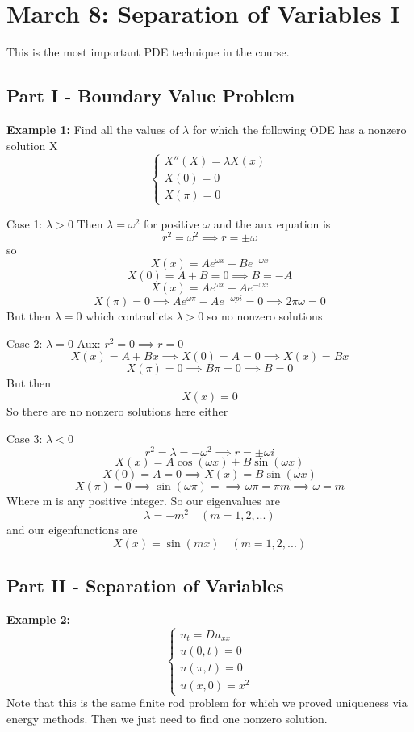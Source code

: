 \documentclass[12pt]{article}
\begin{document}
\section{March 8: Separation of Variables I}
This is the most important PDE technique in the course. 

\subsection*{Part I - Boundary Value Problem}
\textbf{Example 1:}
Find all the values of $\lambda$ for which the following ODE has a nonzero solution X 
\[\begin{cases}
    X''(X) = \lambda X(x)\\
    X(0) = 0\\
    X(\pi) = 0
\end{cases}\]

Case 1: $\lambda > 0$ 
Then $\lambda = \omega^2$ for positive $\omega$ and the aux equation is 
\[r^2 = \omega^2 \implies r = \pm \omega\]
so 
\[X(x) = Ae^{\omega x} + Be^{-\omega x}\] 
\[X(0) = A + B = 0 \implies B = -A\]
\[X(x) = Ae^{\omega x} -Ae^{-\omega x}\]
\[X(\pi) = 0 \implies Ae^{\omega \pi} -Ae^{-\omega pi} = 0 \implies 2\pi \omega = 0\]
But then $\lambda = 0$ which contradicts $\lambda >0$ so no nonzero solutions 

Case 2: $\lambda = 0$
Aux: $r^2 = 0 \implies r = 0$
\[X(x) = A + Bx \implies X(0) = A = 0 \implies X(x) = Bx\]
\[X(\pi) = 0 \implies B\pi = 0 \implies B = 0\]
But then 
\[X(x) = 0\]
So there are no nonzero solutions here either 

Case 3: $\lambda < 0$
\[r^2 = \lambda = -\omega^2 \implies r = \pm \omega i\]
\[X(x) = A\cos(\omega x) + B\sin(\omega x)\]
\[X(0) = A = 0 \implies X(x) = B\sin(\omega x)\]
\[X(\pi) = 0 \implies \sin(\omega \pi) = \implies \omega \pi = \pi m \implies \omega = m\]
Where m is any positive integer. So our eigenvalues are
\[\lambda = -m^2 \quad (m = 1, 2, ...)\]
and our eigenfunctions are 
\[X(x) = \sin(mx) \quad (m = 1, 2, ...)\]

\subsection*{Part II - Separation of Variables}
\textbf{Example 2:}
\[\begin{cases}
    u_t = Du_{xx}\\
    u(0, t) = 0\\
    u(\pi, t) = 0\\
    u(x, 0) = x^2
\end{cases}\]
Note that this is the same finite rod problem for which we proved uniqueness via energy methods. Then we just need to find one nonzero solution.
\end{document}
